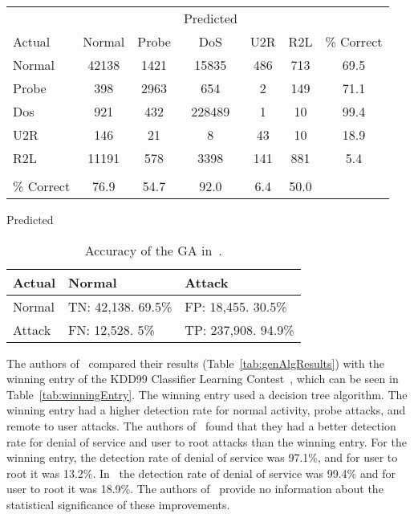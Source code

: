 \documentclass{sig-alternate}
\begin{document}
\begin{table*}
\center
\caption{Results for GA Experiment in~\cite{DBLP:journals/corr/abs-1204-1336}.}
\vspace{0.20cm}
\begin{tabular}{l|cccccc}
& & & Predicted & & & \\
Actual & Normal & Probe & DoS & U2R & R2L & \% Correct \\ \hline
Normal & 42138 & 1421 & 15835 & 486 & 713 & 69.5\\
Probe & 398 & 2963 & 654 & 2 & 149 & 71.1   \\
Dos & 921 & 432 & 228489 & 1 & 10 & 99.4\\
U2R & 146 & 21 & 8 & 43 & 10 & 18.9\\
R2L & 11191 & 578 & 3398 & 141 & 881 & 5.4\\
& &&&&& \\
\% Correct &  76.9 & 54.7 & 92.0 & 6.4 & 50.0 & \\
\end{tabular}
\center
\label{tab:genAlgResults}
\end{table*}



\begin{table}
\center
\caption{Accuracy of the GA in~\cite{DBLP:journals/corr/abs-1204-1336}.}
\vspace{0.20cm}
Predicted
\begin{tabular}{l|ll}
Actual & Normal & Attack \\ \hline
Normal & TN: 42,138. 69.5\% & FP: 18,455. 30.5\% \\
Attack & FN: 12,528. 5\% & TP: 237,908. 94.9\%  \\
\end{tabular}
\center
\label{tab:genAlgResults2}
\end{table}


The authors of~\cite{DBLP:journals/corr/abs-1204-1336} compared their results (Table~\ref{tab:genAlgResults}) with the winning entry of the KDD99 Classifier Learning Contest~\cite{KDD99Contest}, which can be seen in Table~\ref{tab:winningEntry}. The winning entry used a decision tree algorithm. The winning entry had a higher detection rate for normal activity, probe attacks, and remote to user attacks. The authors of~\cite{DBLP:journals/corr/abs-1204-1336} found that they had a better detection rate for denial of service and user to root attacks than the winning entry. For the winning entry, the detection rate of denial of service was 97.1\%, and for user to root it was 13.2\%. In~\cite{DBLP:journals/corr/abs-1204-1336} the detection rate of denial of service was 99.4\% and for user to root it was 18.9\%. The authors of~\cite{DBLP:journals/corr/abs-1204-1336} provide no information about the statistical significance of these improvements.
\end{document}
